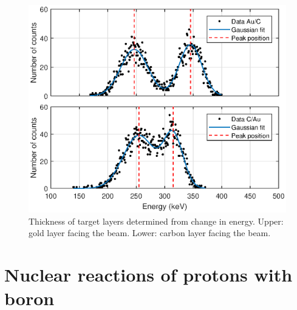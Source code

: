 \begin{figure}[t]
\centering
\includegraphics[width=0.99\columnwidth]{Dterminethicknessplot.eps}
\caption{Thickness of target layers determined from change in energy. Upper: gold layer facing the beam. Lower: carbon layer facing the beam.}
\label{fig_thickness}
\end{figure}



\section{Nuclear reactions of protons with boron}

